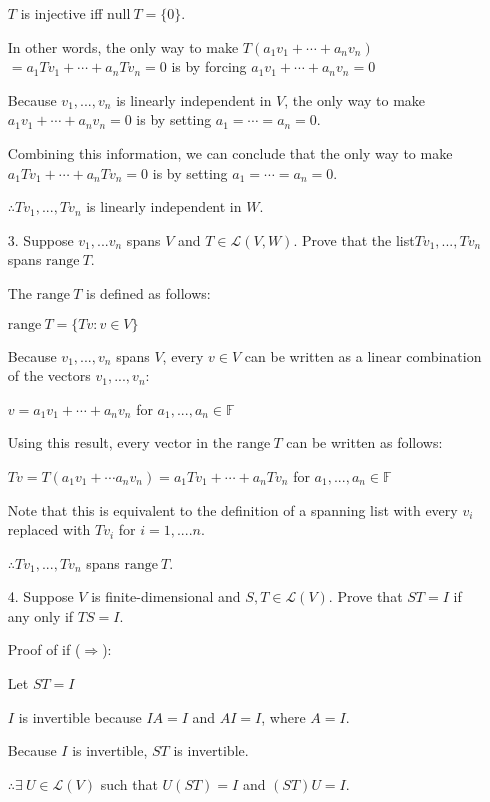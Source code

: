 \documentclass[fleqn]{article}
\begin{document}
\begin{enumerate}[nolistsep]
	$T$ is injective iff $\text{null}\ T = \{0\}$.
	
	In other words, the only way to make $T(a_1v_1 + \cdots + a_nv_n)$\newline$= a_1Tv_1 + \cdots + a_nTv_n = 0$ is by forcing $a_1v_1 + \cdots + a_nv_n = 0$ 
	
	Because $v_1,...,v_n$ is linearly independent in $V$, the only way to make $a_1v_1 + \cdots + a_nv_n = 0$ is by setting $a_1 = \cdots = a_n = 0$.
	
	Combining this information, we can conclude that the only way to make $a_1Tv_1 + \cdots + a_nTv_n = 0$ is by setting $a_1 = \cdots = a_n = 0$.
	
	$\therefore Tv_1,...,Tv_n$ is linearly independent in $W$.
	
		\item[3.] Suppose $v_1,...v_n$ spans $V$ and $T \in \mathcal{L}(V,W)$. Prove that the list\newline $Tv_1,...,Tv_n$ spans $\text{range}\ T$.

		The $\text{range}\ T$ is defined as follows:
		
		$\text{range}\ T = \{Tv : v \in V\}$
		
		Because $v_1,...,v_n$ spans $V$, every $v \in V$ can be written as a linear combination of the vectors $v_1,...,v_n$:
		
		$v = a_1v_1 + \cdots + a_nv_n$ for $a_1,...,a_n \in \mathbb{F}$
		
		Using this result, every vector in the $\text{range}\ T$ can be written as follows:
		
		$Tv = T(a_1v_1 + \cdots a_nv_n) = a_1Tv_1 + \cdots + a_nTv_n$ for $a_1,...,a_n \in \mathbb{F}$
		
		Note that this is equivalent to the definition of a spanning list with every $v_i$ replaced with $Tv_i$ for $i = 1,....n$.
		
		$\therefore Tv_1,...,Tv_n$ spans $\text{range}\ T$.
		
		\item[4.] Suppose $V$ is finite-dimensional and $S,T \in \mathcal{L}(V)$. Prove that $ST = I$ if any only if $TS = I$.
		
	Proof of if ($\Rightarrow$):
	
	Let $ST = I$
	
	$I$ is invertible because $IA = I$ and $AI = I$, where $A = I$.
	
	Because $I$ is invertible, $ST$ is invertible.
	
	$\therefore \exists\ U \in \mathcal{L}(V)$ such that $U(ST) = I$ and $(ST)U = I$.
	

\end{enumerate}
\end{document}
